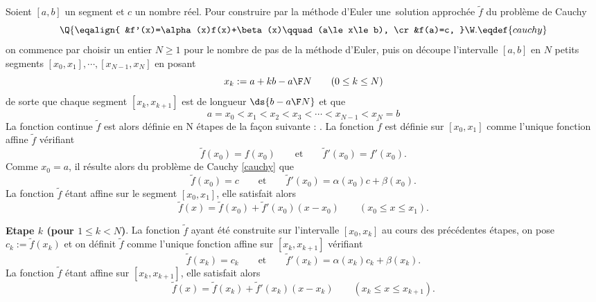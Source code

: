 \noindent
Soient $[a,b]$ un segment et $c$ un nombre r\'eel. Pour construire par la m\'ethode d'Euler une~solution approch\'ee $\tilde f$ du probl\`eme de Cauchy
$$
\Q\{\eqalign{
&f'(x)=\alpha(x)f(x)+\beta(x)\qquad(a\le x\le b),
\cr
&f(a)=c, 
}\W.\eqdef{cauchy}
$$
on commence par choisir un entier $N\ge1$ pour le nombre de pas de la m\'ethode d'Euler, 
puis on d\'ecoupe l'intervalle $[a,b]$ en $N$ petits segments $[x_0,x_1],\cdots,[x_{N-1},x_N]$ en posant 
$$
x_k:=a+k{b-a\F N}\qquad (0\le k\le N)
$$
de sorte que chaque segment $[x_k,x_{k+1}]$ est de longueur $\ds{b-a\F N}$ et que 
$$
a=x_0<x_1<x_2<x_3<\cdots<x_{N-1}<x_N=b
$$
La fonction continue $\tilde f$ est alors d\'efinie en N \'etapes de la fa\c con suivante : \medskip\noindent
{}. La fonction $\tilde f$ est d\'efinie sur $[x_0,x_1]$ comme l'unique fonction affine $\tilde f$ v\'erifiant 
$$
\tilde f(x_0)=f(x_0)\qquad\mbox{et}\qquad \tilde f'(x_0)=f'(x_0). 
$$
Comme $x_0=a$, il r\'esulte alors du probl\`eme de Cauchy \eqref{cauchy} que 
$$
\tilde f(x_0)=c\qquad\mbox{et}\qquad\tilde f'(x_0)=\alpha(x_0)c+\beta(x_0).
$$ 
La fonction $\tilde f$ \'etant affine sur le segment $[x_0,x_1]$, elle satisfait alors 
$$
\tilde f(x)=\tilde f(x_0)+\tilde f'(x_0)(x-x_0)\qquad (x_0\le x\le x_1).
$$

\medskip
\noindent
{\bf Etape $k$ (pour $1\le k<N$)}. La fonction $\tilde f$ ayant \'et\'e construite sur l'intervalle $[x_0,x_k]$ au cours des pr\'ec\'edentes \'etapes, 
on pose $c_k:=\tilde f(x_k)$ et on d\'efinit $\tilde f$ comme l'unique fonction affine sur $[x_k,x_{k+1}]$ v\'erifiant 
$$
\tilde f(x_k)=c_k\qquad\mbox{et}\qquad \tilde f'(x_k)=\alpha(x_k)c_k+\beta(x_k). 
$$
La fonction $\tilde f$ \'etant affine sur $[x_k,x_{k+1}]$, elle satisfait alors 
$$
\tilde f(x)=\tilde f(x_k)+\tilde f'(x_k)(x-x_k)\qquad (x_k\le x\le x_{k+1}).
$$


